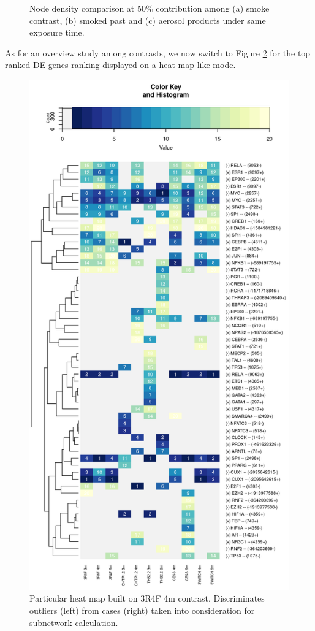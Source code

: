 \begin{figure}
    \caption{Node density comparison at 50\% contribution among (a) smoke contrast, (b) smoked past and (c) aerosol products under same exposure time.}
    \label{fig:compare-density}
\end{figure}

As for an overview study among contrasts, we now switch to Figure \ref{fig:heatmap-overview} for the top ranked DE genes ranking displayed on a heat-map-like mode.

\begin{figure}
    \centering
    \includegraphics[width=\textwidth, height=\textheight, keepaspectratio]{Major Thesis/figures/iut/heat/heatmap-contrasts.png}
    \caption{Particular heat map built on 3R4F 4m contrast. Discriminates outliers (left) from cases (right) taken into consideration for subnetwork calculation.}
    \label{fig:heatmap-overview}
\end{figure}

